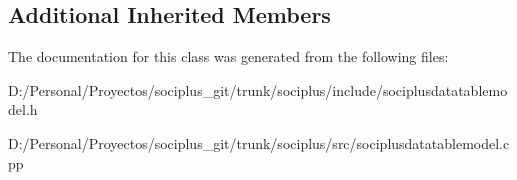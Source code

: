 \subsection*{Additional Inherited Members}


The documentation for this class was generated from the following files\+:\begin{DoxyCompactItemize}
\item 
D\+:/\+Personal/\+Proyectos/sociplus\+\_\+git/trunk/sociplus/include/sociplusdatatablemodel.\+h\item 
D\+:/\+Personal/\+Proyectos/sociplus\+\_\+git/trunk/sociplus/src/sociplusdatatablemodel.\+cpp\end{DoxyCompactItemize}
